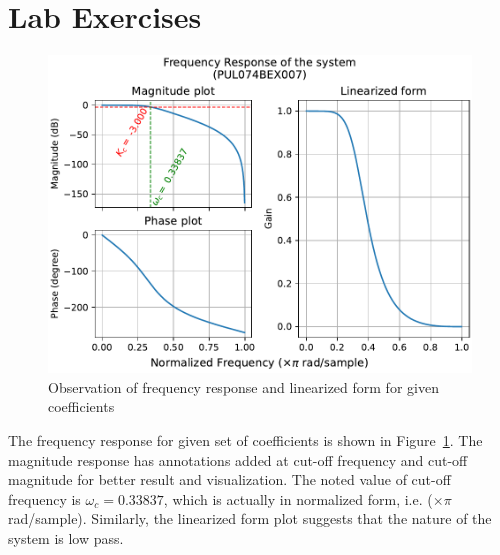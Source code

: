 \documentclass{lab_sheet}
\begin{document}
\section{Lab Exercises}
\begin{figure}[H]
	\centering
	\includegraphics[width=\linewidth]{../Figures/lab_4_1_py.pdf}
	\caption{Observation of frequency response and linearized form for given coefficients}
	\label{fig:4_1_py}
\end{figure}
The frequency response for given set of coefficients is shown in Figure~\ref{fig:4_1_py}. The magnitude response has annotations added at cut-off frequency and cut-off magnitude for better result and visualization. The noted value of cut-off frequency is $\omega_c=0.33837$, which is actually in normalized form, i.e. ($\times \pi$ rad/sample). Similarly, the linearized form plot suggests that the nature of the system is low pass.
\end{document}
